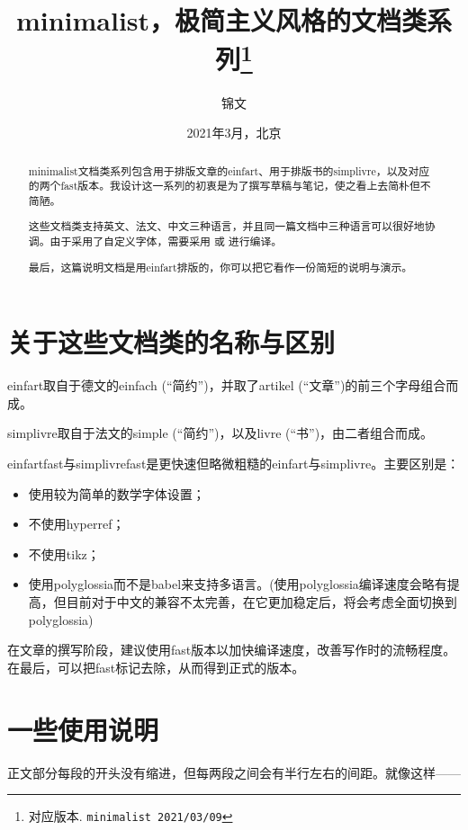 \documentclass{einfart}
\begin{document}
\title{minimalist，极简主义风格的文档类系列\thanks{对应版本. \texttt{minimalist 2021/03/09}}}
\author{锦文}
\date{2021年3月，北京}

\maketitle

\begin{abstract}
    minimalist文档类系列包含用于排版文章的einfart、用于排版书的simplivre，以及对应的两个fast版本。我设计这一系列的初衷是为了撰写草稿与笔记，使之看上去简朴但不简陋。

    这些文档类支持英文、法文、中文三种语言，并且同一篇文档中三种语言可以很好地协调。由于采用了自定义字体，需要采用  或  进行编译。
    
    最后，这篇说明文档是用einfart排版的，你可以把它看作一份简短的说明与演示。
\end{abstract}

\section{关于这些文档类的名称与区别}
einfart取自于德文的einfach (“简约”)，并取了artikel (“文章”)的前三个字母组合而成。

simplivre取自于法文的simple (“简约”)，以及livre (“书”)，由二者组合而成。

einfartfast与simplivrefast是更快速但略微粗糙的einfart与simplivre。主要区别是：
\begin{itemize}
    \item 使用较为简单的数学字体设置；
    \item 不使用hyperref；
    \item 不使用tikz；
    \item 使用polyglossia而不是babel来支持多语言。(使用polyglossia编译速度会略有提高，但目前对于中文的兼容不太完善，在它更加稳定后，将会考虑全面切换到polyglossia)
\end{itemize}

在文章的撰写阶段，建议使用fast版本以加快编译速度，改善写作时的流畅程度。在最后，可以把fast标记去除，从而得到正式的版本。

\section{一些使用说明}

正文部分每段的开头没有缩进，但每两段之间会有半行左右的间距。就像这样——
\end{document}
